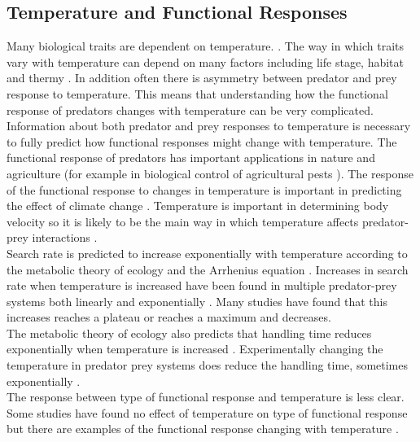 \documentclass{article}
\begin{document}
\subsection{Temperature and Functional Responses}
Many biological traits are dependent on temperature. \cite{Dell2014TemperatureStrategy,Dell2011SystematicTraits}. The way in which traits vary with temperature can depend on many factors including life stage\cite{Cator2019MoreResearch}, habitat \cite{Dell2011SystematicTraits} and thermy \cite{Dell2014TemperatureStrategy}. In addition often there is asymmetry between predator and prey response to temperature\cite{Dell2014TemperatureStrategy}. This means that understanding how the functional response of predators changes with temperature can be very complicated. Information about both predator and prey responses to temperature is necessary to fully predict how functional responses might change with temperature. The functional response of predators has important applications in nature and agriculture (for example in biological control of agricultural pests \cite{Gilioli2005TemperatureIndividuals} ). The response of the functional response to changes in temperature is important in predicting the effect of climate change \cite{Ohlund2014TemperaturePrey}.  Temperature is important in determining body velocity so it is likely to be the main way in which temperature affects predator-prey interactions \cite{Dell2014TemperatureStrategy}.\\
Search rate is predicted to increase exponentially with temperature according to the metabolic theory of ecology and the Arrhenius equation \cite{Brown2004TowardEcology,Dell2014TemperatureStrategy,Englund2011TemperatureResponse}. Increases in search rate when temperature is increased have been found in multiple predator-prey systems both linearly \cite{Gilioli2005TemperatureIndividuals,Zamani2006Temperature-dependentAphid} and exponentially \cite{Lefebure2014TemperatureResource-limited}. Many studies have found that this increases reaches a plateau \cite{McCoull1998EffectNaucoridae,Thompson1978TowardsElegans} or reaches a maximum and decreases\cite{Englund2011TemperatureResponse,Zamani2006Temperature-dependentAphid,Sentis2012UsingEfficiency}.
\\
The metabolic theory of ecology \cite{Brown2004TowardEcology} also predicts that handling time reduces exponentially when temperature is increased \cite{Dell2014TemperatureStrategy}. Experimentally changing the temperature in predator prey systems does reduce the handling time\cite{Thompson1978TowardsElegans,McCoull1998EffectNaucoridae,Jalali2010EffectPersicae,Zamani2006Temperature-dependentAphid}, sometimes exponentially \cite{Sentis2012UsingEfficiency,}. \\
The response between type of functional response and temperature is less clear. Some studies have found no effect of temperature on type of functional response  \cite{Sentis2012UsingEfficiency} but there are examples of the functional response changing with temperature \cite{Taylor2003EffectAmericanus}.
\end{document}
